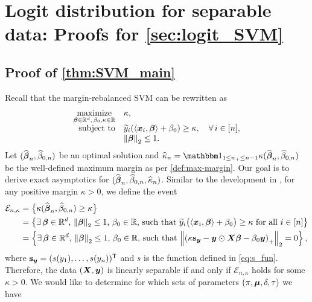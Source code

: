 \section{Logit distribution for separable data: Proofs for \cref{sec:logit_SVM}}
\label{append_sec:sep}

\subsection{Proof of \cref{thm:SVM_main}}
\label{append_subsec:sep}

Recall that the margin-rebalanced SVM can be rewritten as
\begin{equation}
    \label{eq:over_max-margin}
    \begin{array}{rl}
    \operatorname*{\mathrm{maximize}}\limits_{\text{\boldmath $\beta$} \in \mathbb{R}^d, \, \beta_0, \kappa \in \mathbb{R}} & \kappa, \\
    \text{subject to} & \widetilde{y}_i ( \langle \text{\boldmath $x$}_i, \text{\boldmath $\beta$} \rangle + \beta_0 ) \ge \kappa,
	\quad \forall\, i \in [n], \\
	&  \left\|{\text{\boldmath $\beta$}}\right\|_2 \le 1.
    \end{array}
\end{equation}
Let $(\widehat {{\boldsymbol{\beta}}}_n, \widehat \beta_{0, n})$ be an optimal solution and $\hat\kappa_n = \ind_{1 \le n_+ \le n - 1} \kappa(\hat \vbeta_n, \hat \beta_{0, n})$ be the well-defined maximum margin as per \cref{def:max-margin}. Our goal is to derive exact asymptotics for $(\widehat {{\boldsymbol{\beta}}}_n, \widehat \beta_{0, n}, \widehat\kappa_n)$. Similar to the development in \cite{montanari2023generalizationerrormaxmarginlinear}, for any positive margin $\kappa > 0$, we define the event
\begin{align*}
        \mathcal{E}_{n, \kappa} & = \bigl\{  \kappa(\widehat {{\boldsymbol{\beta}}}_n, \widehat \beta_{0, n})  \ge \kappa \bigr\}  \\
        & =  \left\{ \text{$\exists\, {\boldsymbol{\beta}} \in \mathbb{R}^d$, $\left\|{\text{\boldmath $\beta$}}\right\|_2 \le 1$, $\beta_0 \in \mathbb{R}$, such that $\widetilde{y}_i \big( \langle \text{\boldmath $x$}_i, \text{\boldmath $\beta$} \rangle + \beta_0 \big) \ge \kappa$ for all $i \in [n]$} \right\} \\
        & = \left\{ \text{$\exists\, {\boldsymbol{\beta}} \in \mathbb{R}^d$, $\left\|{\text{\boldmath $\beta$}}\right\|_2 \le 1$, $\beta_0 \in \mathbb{R}$, such that $\left\|{ \left( \kappa \mathrm{\bf s}_{\text{\boldmath $y$}} - \text{\boldmath $y$} \odot \text{\boldmath $X$} {\boldsymbol{\beta}}  - \beta_0 \text{\boldmath $y$} \right)_+ }\right\|_2 = 0$} \right\},
\end{align*}
where $\mathrm{\bf s}_{\text{\boldmath $y$}} = (s(y_1), \dots, s(y_n))^{\sf T}$ and $s$ is the function defined in \cref{eq:s_fun}. Therefore, the data $(\text{\boldmath $X$}, \text{\boldmath $y$})$ is linearly separable if and only if $\mathcal{E}_{n, \kappa}$ holds for some $\kappa > 0$. We would like to determine for which sets of parameters $(\pi, {\boldsymbol{\mu}}, \delta, \tau)$ we have
